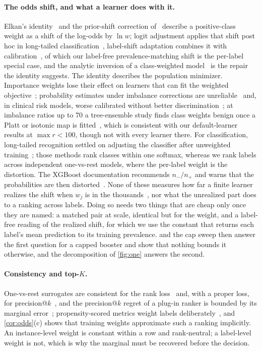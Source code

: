 \documentclass[sigconf,nonacm]{acmart}
\begin{document}
\paragraph{The odds shift, and what a learner does with it.} Elkan's identity~\cite{Elkan2001} and the prior-shift correction of~\cite{Saerens2002} describe a positive-class weight as a shift of the log-odds by $\ln w$; logit adjustment applies that shift post hoc in long-tailed classification~\cite{Menon2021LogitAdjust}, label-shift adaptation combines it with calibration~\cite{Lipton2018LabelShift}, of which our label-free prevalence-matching shift is the per-label special case, and the analytic inversion of a class-weighted model~\cite{Caplin2022ClassWeights} is the repair the identity suggests. The identity describes the population minimizer. Importance weights lose their effect on learners that can fit the weighted objective~\cite{Byrd2019}; probability estimates under imbalance corrections are unreliable~\cite{Wallace2012} and, in clinical risk models, worse calibrated without better discrimination~\cite{VandenGoorbergh2022}; at imbalance ratios up to 70 a tree-ensemble study finds class weights benign once a Platt or isotonic map is fitted~\cite{Liu2026Resampling}, which is consistent with our default-learner results at $\max r<100$, though not with every learner there. For classification, long-tailed recognition settled on adjusting the classifier after unweighted training~\cite{Kang2020Decoupling,Menon2021LogitAdjust}; those methods rank classes within one softmax, whereas we rank labels across independent one-vs-rest models, where the per-label weight is the distortion. The XGBoost documentation recommends $n_-/n_+$ and warns that the probabilities are then distorted~\cite{XGBoostDocs}. None of these measures how far a finite learner realizes the shift when $w_j$ is in the thousands~\cite{Friedman2001GBM}, nor what the unrealized part does to a ranking across labels. Doing so needs two things that are cheap only once they are named: a matched pair at scale, identical but for the weight, and a label-free reading of the realized shift, for which we use the constant that returns each label's mean prediction to its training prevalence.  and the cap sweep then answer the first question for a capped booster and show that nothing bounds it otherwise, and the decomposition of \cref{fig:one} answers the second.

\paragraph{Consistency and top-$K$.} One-vs-rest surrogates are consistent for the rank loss~\cite{Dembczynski2012Univariate} and, with a proper loss, for precision@$k$~\cite{Menon2019Reductions}, and the precision@$k$ regret of a plug-in ranker is bounded by its marginal error~\cite{Wydmuch2018PLT}; propensity-scored metrics weight labels deliberately~\cite{Jain2016XMLLoss}, and \cref{cor:odds}(c) shows that training weights approximate such a ranking implicitly. An instance-level weight is constant within a row and rank-neutral; a label-level weight is not, which is why the marginal must be recovered before the decision.
\end{document}
